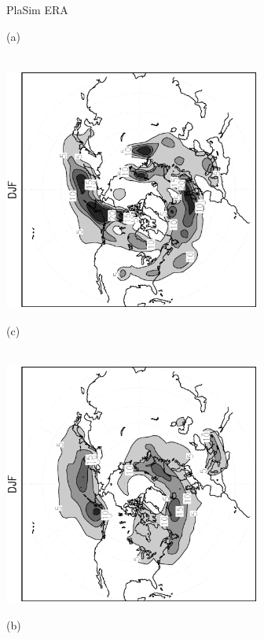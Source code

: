 \documentclass[12pt,a4paper,twoside,openright,headinclude,liststotoc,bibtotoc]{scrreprt}
\begin{document}
\begin{figure}[c]
\hspace{3.8cm}PlaSim \vspace{0.2cm} \hspace{7.3cm} ERA \\
\parbox{8.5cm}{\hspace{0.95cm}\begin{scriptsize}(a)\end{scriptsize} \vspace{-0.5cm} \\
\includegraphics[height=8.0cm,angle=-90]
{eps/cycldensity_PLASIM_T21_45DJF.eps}
}
\parbox{8.5cm}{\hspace{0.95cm}\begin{scriptsize}(c)\end{scriptsize} \vspace{-0.5cm} \\
\includegraphics[height=8.0cm,angle=-90]
{eps/cycldensity_ERA40_T21_45DJF.eps}
}
\parbox{8.5cm}{\hspace{0.95cm}\begin{scriptsize}(b)\end{scriptsize} \vspace{-0.5cm} \\
}
\end{figure}
\end{document}
